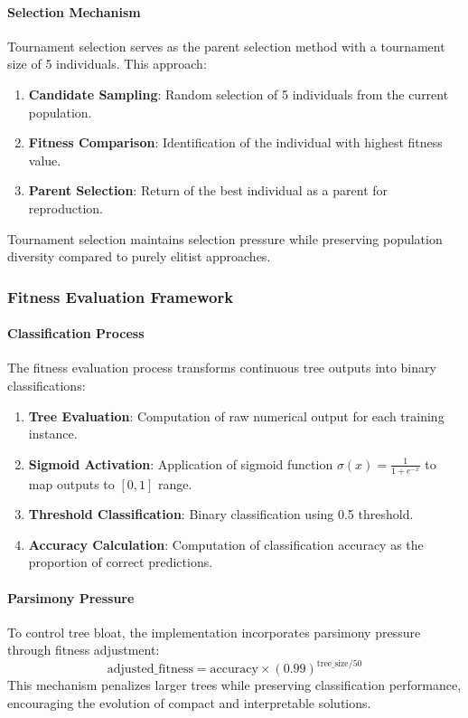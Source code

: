 \documentclass[a4paper,12pt]{article}
\begin{document}
\paragraph{Selection Mechanism}
Tournament selection serves as the parent selection method with a tournament size of 5 individuals. This approach:
\begin{enumerate}
    \item \textbf{Candidate Sampling}: Random selection of 5 individuals from the current population.
    \item \textbf{Fitness Comparison}: Identification of the individual with highest fitness value.
    \item \textbf{Parent Selection}: Return of the best individual as a parent for reproduction.
\end{enumerate}
Tournament selection maintains selection pressure while preserving population diversity compared to purely elitist approaches.

\subsubsection{Fitness Evaluation Framework}
\paragraph{Classification Process}
The fitness evaluation process transforms continuous tree outputs into binary classifications:
\begin{enumerate}
    \item \textbf{Tree Evaluation}: Computation of raw numerical output for each training instance.
    \item \textbf{Sigmoid Activation}: Application of sigmoid function $\sigma(x) = \frac{1}{1+e^{-x}}$ to map outputs to $[0,1]$ range.
    \item \textbf{Threshold Classification}: Binary classification using 0.5 threshold.
    \item \textbf{Accuracy Calculation}: Computation of classification accuracy as the proportion of correct predictions.
\end{enumerate}

\paragraph{Parsimony Pressure}
To control tree bloat, the implementation incorporates parsimony pressure through fitness adjustment:
\begin{equation}
\text{adjusted\_fitness} = \text{accuracy} \times (0.99)^{\text{tree\_size}/50}
\end{equation}
This mechanism penalizes larger trees while preserving classification performance, encouraging the evolution of compact and interpretable solutions.
\end{document}
